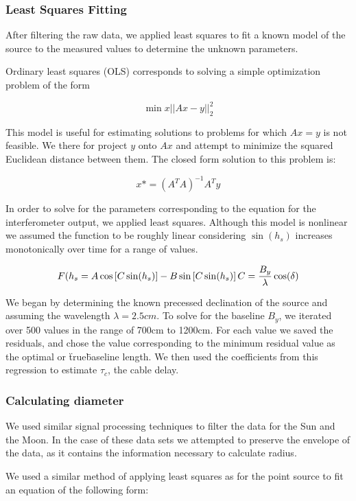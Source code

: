 \documentclass{article}
\begin{document}
  \subsubsection{Least Squares Fitting}
  After filtering the raw data, we applied least squares to fit a known model
  of the source to the measured values to determine the unknown parameters.

  Ordinary least squares (OLS) corresponds to solving a simple optimization
  problem of the form

  \[\min{x} ||Ax - y||^2_2 \]

  This model is useful for estimating solutions to problems for which $Ax=y$ is
  not feasible. We there for project $y$ onto $Ax$ and attempt to minimize the
  squared Euclidean distance between them. The closed form solution to this
  problem is:

  \[x* = (A^{T}A)^{-1}A^{T}y \]

  In order to solve for the parameters corresponding to the equation for the
  interferometer output, we applied least squares.  Although this model is
  nonlinear we assumed the function to be roughly linear considering $\sin(h_s)$
  increases monotonically over time for a range of values.

  \[F(h_{s} = A\cos \left [C\sin(h_{s})\right] - B\sin \left
  [C\sin(h_{s})\right]\\
  C = \frac{B_{y}}{\lambda}\cos(\delta)
  \]

  We began by determining the known precessed declination of the source and
  assuming the wavelength $\lambda = 2.5cm$. To solve for the baseline $B_{y}$,
  we iterated over 500 values in the range of 700cm to 1200cm. For each value we
  saved the residuals, and chose the value corresponding to the minimum residual
  value as the optimal or \"true\" baseline length. We then used the
  coefficients from this regression to estimate $\tau_c$, the cable delay.

  \subsubsection{Calculating diameter}
  We used similar signal processing techniques to filter the data for the Sun
  and the Moon. In the case of these data sets we attempted to preserve the
  envelope of the data, as it contains the information necessary to calculate
  radius.

  We used a similar method of applying least squares as for the point source to
  fit an equation of the following form:
\end{document}
